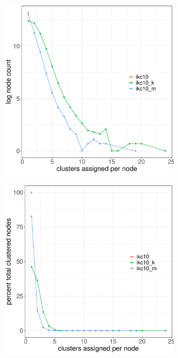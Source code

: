 \documentclass[12pt, oneside]{article}   	%
\begin{document}
	\begin{figure}[H]
		\centering
		\begin{subfigure}[t]{0.48\textwidth}
			\centering
			\includegraphics[width=\linewidth]{fig2a.pdf} 
		\end{subfigure}
		\hfill
		\begin{subfigure}[t]{0.48\textwidth}
			\centering
			\includegraphics[width=\linewidth]{fig2b.pdf} 

\end{subfigure}
\end{figure}
\end{document}

